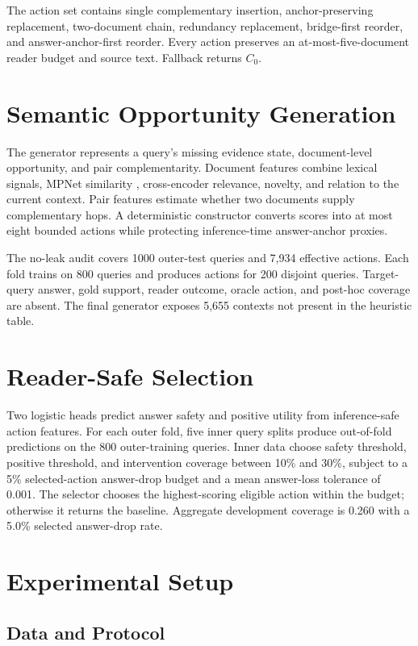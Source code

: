 \documentclass[10pt,twocolumn]{article}
\begin{document}
The action set contains single complementary insertion, anchor-preserving replacement, two-document chain, redundancy replacement, bridge-first reorder, and answer-anchor-first reorder. Every action preserves an at-most-five-document reader budget and source text. Fallback returns $C_0$.

\section{Semantic Opportunity Generation}

The generator represents a query's missing evidence state, document-level opportunity, and pair complementarity. Document features combine lexical signals, MPNet similarity \citep{song-etal-2020-mpnet}, cross-encoder relevance, novelty, and relation to the current context. Pair features estimate whether two documents supply complementary hops. A deterministic constructor converts scores into at most eight bounded actions while protecting inference-time answer-anchor proxies.

The no-leak audit covers 1000 outer-test queries and 7,934 effective actions. Each fold trains on 800 queries and produces actions for 200 disjoint queries. Target-query answer, gold support, reader outcome, oracle action, and post-hoc coverage are absent. The final generator exposes 5,655 contexts not present in the heuristic table.

\section{Reader-Safe Selection}

Two logistic heads predict answer safety and positive utility from inference-safe action features. For each outer fold, five inner query splits produce out-of-fold predictions on the 800 outer-training queries. Inner data choose safety threshold, positive threshold, and intervention coverage between 10\% and 30\%, subject to a 5\% selected-action answer-drop budget and a mean answer-loss tolerance of 0.001. The selector chooses the highest-scoring eligible action within the budget; otherwise it returns the baseline. Aggregate development coverage is 0.260 with a 5.0\% selected answer-drop rate.

\section{Experimental Setup}

\subsection{Data and Protocol}
\end{document}
